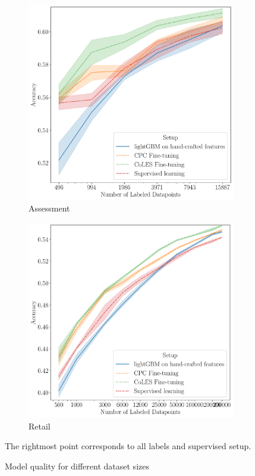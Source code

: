 \documentclass[sigconf]{acmart}
\begin{document}
\begin{figure}
\begin{subfigure}{0.25\linewidth}
  \end{subfigure}%
  \begin{subfigure}{0.25\linewidth}
    \caption{Assessment}
    \includegraphics[width=\linewidth]{figures/ss_bowl2019.pdf}
  \end{subfigure}%
  \begin{subfigure}{0.25\linewidth}
    \caption{Retail}
    \includegraphics[width=\linewidth]{figures/ss_x5.pdf}
  \end{subfigure}
  \caption{
    Model quality for different dataset sizes
  }
  \small{The rightmost point corresponds to all labels and supervised setup.}
  \label{fig-semi-main}
\end{figure}
\end{document}
